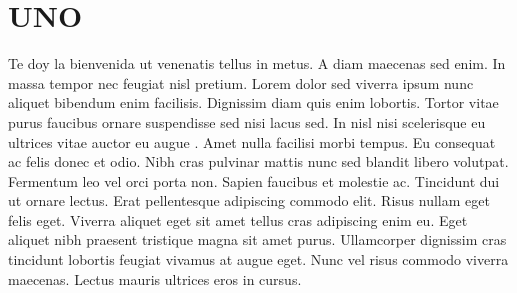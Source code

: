 \section{UNO}
    Te doy la bienvenida ut venenatis tellus in metus. A diam maecenas sed enim. In massa tempor nec feugiat nisl pretium. Lorem
    dolor sed viverra ipsum nunc aliquet bibendum enim facilisis. Dignissim diam quis enim lobortis. Tortor vitae
    purus faucibus ornare suspendisse sed nisi lacus sed. In nisl nisi scelerisque eu ultrices vitae auctor eu augue
    . Amet nulla facilisi morbi tempus. Eu consequat ac felis donec et odio. Nibh cras pulvinar mattis nunc sed
    blandit libero volutpat. Fermentum leo vel orci porta non. Sapien faucibus et molestie ac. Tincidunt dui ut
    ornare lectus. Erat pellentesque adipiscing commodo elit. Risus nullam eget felis eget. Viverra aliquet eget sit
    amet tellus cras adipiscing enim eu. Eget aliquet nibh praesent tristique magna sit amet purus. Ullamcorper
    dignissim cras tincidunt lobortis feugiat vivamus at augue eget. Nunc vel risus commodo viverra maecenas. Lectus
    mauris ultrices eros in cursus.
